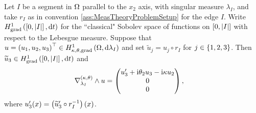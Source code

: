 \begin{prop} \label{prop:TangCurlsSegment}
	Let $I$ be a segment in $\Omega$ parallel to the $x_2$ axis, with singular measure $\lambda_I$, and take $r_I$ as in convention \ref{ass:MeasTheoryProblemSetup} for the edge $I$.
	Write $H^1_\mathrm{grad}\left( \left[ 0,\left\lvert I \right\rvert \right], \mathrm{d}t \right)$ for the ``classical" Sobolev space of functions on $\left[ 0,\left\lvert I \right\rvert \right]$ with respect to the Lebesgue measure.
	Suppose that $u=\left( u_1, u_2, u_3 \right)^\top\in H^1_{\kappa,\theta,\mathrm{grad}}\left( \Omega, \mathrm{d}\lambda_I \right)$ and set $\widetilde{u}_j = u_j \circ r_I$ for $j\in\left\{ 1,2,3 \right\}$.
	Then $\widetilde{u}_3\in H^1_\mathrm{grad}\left( \left[ 0,\left\lvert I \right\rvert \right], \mathrm{d}t \right)$ and
	\begin{align*}
		\nabla_{\lambda_I}^{\left( \kappa, \theta \right)}\wedge u &= 
		\begin{pmatrix} u_3' + \mathrm{i}\theta_2 u_3 - \mathrm{i}\kappa u_2 \\ 0 \\ 0 \end{pmatrix},
	\end{align*}
	where $u_3'(x) = \left( \widetilde{u}'_3\circ r_I^{-1} \right)(x)$.
\end{prop}
